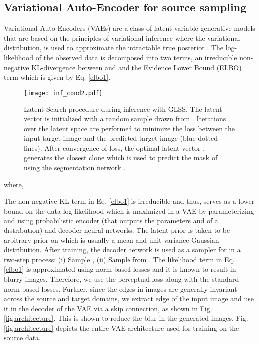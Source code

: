 \documentclass[runningheads]{llncs}
\begin{document}
\subsection{Variational Auto-Encoder for source sampling}
Variational Auto-Encoders (VAEs) \cite{kingma2013auto} are a class of latent-variable generative models that are based on the principles of variational inference where the variational distribution,  is used to approximate the intractable true posterior . The log-likelihood of the observed data is decomposed into two terms, an irreducible non-negative KL-divergence between   and   and the Evidence Lower Bound (ELBO) term which is given by Eq. \ref{elbo1}.
\begin{figure}[h]
\begin{center}
    \texttt{[image: inf\_cond2.pdf]}
\caption{Latent Search procedure during inference with GLSS. The latent vector  is initialized with a random sample drawn from . Iterations over the latent space  are performed to minimize the  loss between the input target image  and the predicted target image  (blue dotted lines). After convergence of  loss, the optimal latent vector , generates the closest clone  which is used to predict the mask of  using the segmentation network .}
\label{fig:LatentSearch}
\end{center}
\end{figure}
 where, 

The non-negative KL-term in Eq. \ref{elbo1} is irreducible and thus,   serves as a lower bound on the data log-likelihood which is maximized in a VAE by parameterizing  and  using probabilistic encoder  (that outputs the parameters  and  of a distribution) and decoder  neural networks. The latent prior  is taken to be arbitrary prior on  which is usually a  mean and unit variance Gaussian distribution. After training, the decoder network is used as a sampler for  in a two-step process: (i) Sample , (ii) Sample  from .
The likelihood term in Eq. \ref{elbo1} is approximated using norm based losses and it is known to result in blurry images. Therefore, we use the perceptual loss \cite{johnson2016perceptual} along with the standard norm based losses. Further, since the edges in images are generally invariant across the source and target domains, we extract edge of the input image and use it in the decoder of the VAE via a skip connection, as shown in Fig. \ref{fig:architecture}. This is shown to reduce the blur in the generated images. Fig. \ref{fig:architecture} depicts the entire VAE architecture used for training on the source data. 
\end{document}
